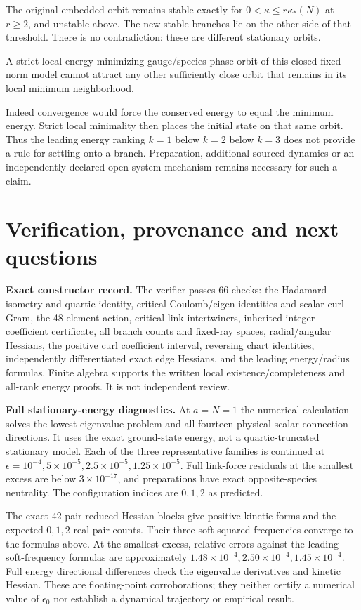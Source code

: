 \documentclass[11pt,a4paper]{article}
\begin{document}
The original embedded orbit remains stable exactly for $0<\kappa\le r\kappa_*(N)$ at $r\ge2$, and unstable above. The new stable branches lie on the other side of that threshold. There is no contradiction: these are different stationary orbits.

\begin{proposition}
A strict local energy-minimizing gauge/species-phase orbit of this closed fixed-norm model cannot attract any other sufficiently close orbit that remains in its local minimum neighborhood.
\end{proposition}
Indeed convergence would force the conserved energy to equal the minimum energy. Strict local minimality then places the initial state on that same orbit. Thus the leading energy ranking $k=1$ below $k=2$ below $k=3$ does not provide a rule for settling onto a branch. Preparation, additional sourced dynamics or an independently declared open-system mechanism remains necessary for such a claim.

\newpage
\section{Verification, provenance and next questions}
\textbf{Exact constructor record.} The verifier passes 66 checks: the Hadamard isometry and quartic identity, critical Coulomb/eigen identities and scalar curl Gram, the 48-element action, critical-link intertwiners, inherited integer coefficient certificate, all branch counts and fixed-ray spaces, radial/angular Hessians, the positive curl coefficient interval, reversing chart identities, independently differentiated exact edge Hessians, and the leading energy/radius formulas. Finite algebra supports the written local existence/completeness and all-rank energy proofs. It is not independent review.

\textbf{Full stationary-energy diagnostics.} At $a=N=1$ the numerical calculation solves the lowest eigenvalue problem and all fourteen physical scalar connection directions. It uses the exact ground-state energy, not a quartic-truncated stationary model. Each of the three representative families is continued at $\epsilon=10^{-4},5\times10^{-5},2.5\times10^{-5},1.25\times10^{-5}$. Full link-force residuals at the smallest excess are below $3\times10^{-17}$, and preparations have exact opposite-species neutrality. The configuration indices are $0,1,2$ as predicted.

The exact 42-pair reduced Hessian blocks give positive kinetic forms and the expected $0,1,2$ real-pair counts. Their three soft squared frequencies converge to the formulas above. At the smallest excess, relative errors against the leading soft-frequency formulas are approximately $1.48\times10^{-4},2.50\times10^{-4},1.45\times10^{-4}$. Full energy directional differences check the eigenvalue derivatives and kinetic Hessian. These are floating-point corroborations; they neither certify a numerical value of $\epsilon_0$ nor establish a dynamical trajectory or empirical result.
\end{document}
